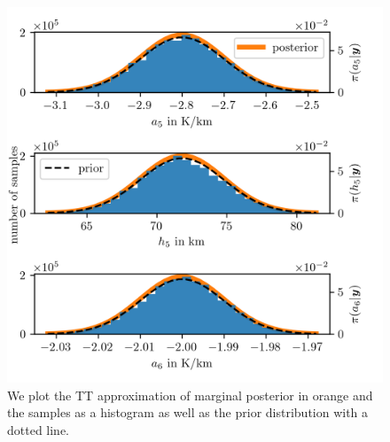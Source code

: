 \begin{figure}[ht!]
	\centering
	\includegraphics{PHdPTPost4.png}
	\caption[Histograms and TT approximation of posterior distribution as well as hyper-prior distribution.]{We plot the TT approximation of marginal posterior in orange and the samples as a histogram as well as the prior distribution with a dotted line.}
	\label{fig:PostHistTT4}
\end{figure}
\clearpage

